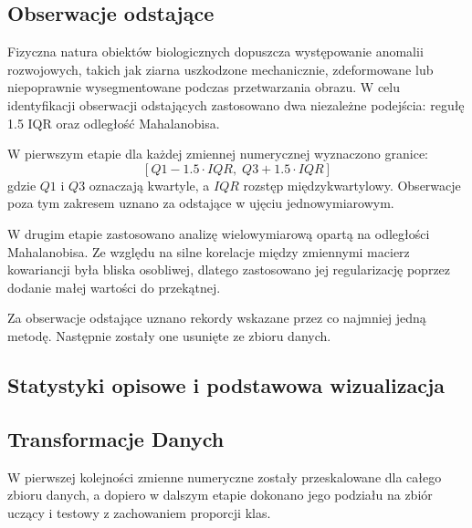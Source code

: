 \documentclass{report}
\begin{document}
\subsection{Obserwacje odstające}

Fizyczna natura obiektów biologicznych dopuszcza występowanie anomalii rozwojowych, takich jak ziarna uszkodzone mechanicznie, zdeformowane lub niepoprawnie wysegmentowane podczas przetwarzania obrazu. W celu identyfikacji obserwacji odstających zastosowano dwa niezależne podejścia: regułę 1.5 IQR oraz odległość Mahalanobisa.

W pierwszym etapie dla każdej zmiennej numerycznej wyznaczono granice:
\[
[Q1 - 1.5 \cdot IQR,\; Q3 + 1.5 \cdot IQR]
\]
gdzie $Q1$ i $Q3$ oznaczają kwartyle, a $IQR$ rozstęp międzykwartylowy. Obserwacje poza tym zakresem uznano za odstające w ujęciu jednowymiarowym.

W drugim etapie zastosowano analizę wielowymiarową opartą na odległości Mahalanobisa. Ze względu na silne korelacje między zmiennymi macierz kowariancji była bliska osobliwej, dlatego zastosowano jej regularizację poprzez dodanie małej wartości do przekątnej.

Za obserwacje odstające uznano rekordy wskazane przez co najmniej jedną metodę. Następnie zostały one usunięte ze zbioru danych.



% 


\subsection{Statystyki opisowe i podstawowa wizualizacja}



\subsection{Transformacje Danych}



W pierwszej kolejności zmienne numeryczne zostały przeskalowane dla całego zbioru danych, a dopiero w dalszym etapie dokonano jego podziału na zbiór uczący i testowy z zachowaniem proporcji klas.
\end{document}
